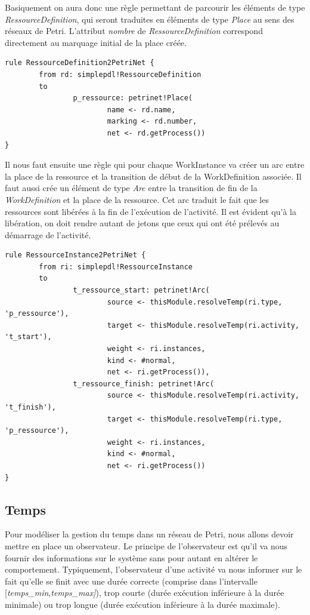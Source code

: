 \documentclass{report}
\begin{document}
Basiquement on aura donc une règle permettant de parcourir les éléments de type \textit{RessourceDefinition}, qui seront traduites en éléments de type \textit{Place} au sens des réseaux de Petri. L'attribut \textit{nombre} de \textit{RessourceDefinition} correspond directement au marquage initial de la place créée.

\begin{verbatim}
rule RessourceDefinition2PetriNet {
        from rd: simplepdl!RessourceDefinition
        to
                p_ressource: petrinet!Place(
                        name <- rd.name,
                        marking <- rd.number,
                        net <- rd.getProcess())
}
\end{verbatim}

Il nous faut ensuite une règle qui pour chaque WorkInstance va créer un arc entre la place de la ressource et la transition de début de la WorkDefinition associée.
Il faut aussi crée un élément de type \textit{Arc} entre la transition de fin de la \textit{WorkDefinition} et la place de la ressource. Cet arc traduit le fait que les ressources sont libérées à la fin de l'exécution de l'activité. Il est évident qu'à la libération, on doit rendre autant de jetons que ceux qui ont été prélevés au démarrage de l'activité.

\begin{verbatim}
rule RessourceInstance2PetriNet {
        from ri: simplepdl!RessourceInstance
        to
                t_ressource_start: petrinet!Arc(
                        source <- thisModule.resolveTemp(ri.type, 'p_ressource'),
                        target <- thisModule.resolveTemp(ri.activity, 't_start'),
                        weight <- ri.instances,
                        kind <- #normal,
                        net <- ri.getProcess()),
                t_ressource_finish: petrinet!Arc(
                        source <- thisModule.resolveTemp(ri.activity, 't_finish'),
                        target <- thisModule.resolveTemp(ri.type, 'p_ressource'),
                        weight <- ri.instances,
                        kind <- #normal,
                        net <- ri.getProcess())
}
\end{verbatim}

\subsection{Temps}

Pour modéliser la gestion du temps dans un réseau de Petri, nous allons devoir mettre en place un observateur. Le principe de l'observateur est qu'il va nous fournir des informations sur le système sans pour autant en altérer le comportement. Typiquement, l'observateur d'une activité va nous informer sur le fait qu'elle se finit avec une durée correcte (comprise dans l'intervalle [\textit{temps\_min},\textit{temps\_max]}), trop courte (durée exécution inférieure à la durée minimale) ou trop longue (durée exécution inférieure à la durée maximale).
\end{document}
